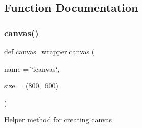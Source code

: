 \subsection{Function Documentation}
\hypertarget{namespacecanvas__wrapper_aeba5fd94e005cd99245deb78314af8d1}{}\label{namespacecanvas__wrapper_aeba5fd94e005cd99245deb78314af8d1} 
\subsubsection{\texorpdfstring{canvas()}{canvas()}}
{\footnotesize\ttfamily def canvas\+\_\+wrapper.\+canvas (\begin{DoxyParamCaption}\item[{}]{name = {\ttfamily \char`\"{}icanvas\char`\"{}},  }\item[{}]{size = {\ttfamily (800,~600)} }\end{DoxyParamCaption})}

\begin{DoxyVerb}Helper method for creating canvas\end{DoxyVerb}
 